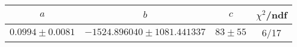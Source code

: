 \begin{tabular}{c|c|c|c}
$a$ & $b$ & $c$ & $\chi^2$/ndf \\
\hline
$0.0994\pm0.0081$ & $-1524.896040\pm1081.441337$ & $83\pm55$ & 6/17
\end{tabular}
